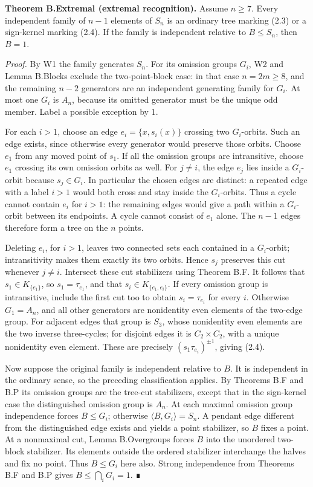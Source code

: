 \documentclass[
  11pt,
  a4paper,
]{article}
\begin{document}
\textbf{Theorem B.Extremal (extremal recognition).} Assume \(n\geq7\).
Every independent family of \(n-1\) elements of \(S_n\) is an ordinary
tree marking (2.3) or a sign-kernel marking (2.4). If the family is
independent relative to \(B\leq S_n\), then \(B=1\).

\emph{Proof.} By W1 the family generates \(S_n\). For its omission
groups \(G_i\), W2 and Lemma B.Blocks exclude the two-point-block case:
in that case \(n=2m\geq8\), and the remaining \(n-2\) generators are an
independent generating family for \(G_i\). At most one \(G_i\) is
\(A_n\), because its omitted generator must be the unique odd member.
Label a possible exception by \(1\).

For each \(i>1\), choose an edge \(e_i=\{x,s_i(x)\}\) crossing two
\(G_i\)-orbits. Such an edge exists, since otherwise every generator
would preserve those orbits. Choose \(e_1\) from any moved point of
\(s_1\). If all the omission groups are intransitive, choose \(e_1\)
crossing its own omission orbits as well. For \(j\ne i\), the edge
\(e_j\) lies inside a \(G_i\)-orbit because \(s_j\in G_i\). In
particular the chosen edges are distinct: a repeated edge with a label
\(i>1\) would both cross and stay inside the \(G_i\)-orbits. Thus a
cycle cannot contain \(e_i\) for \(i>1\): the remaining edges would give
a path within a \(G_i\)-orbit between its endpoints. A cycle cannot
consist of \(e_1\) alone. The \(n-1\) edges therefore form a tree on the
\(n\) points.

Deleting \(e_i\), for \(i>1\), leaves two connected sets each contained
in a \(G_i\)-orbit; intransitivity makes them exactly its two orbits.
Hence \(s_j\) preserves this cut whenever \(j\ne i\). Intersect these
cut stabilizers using Theorem B.F. It follows that
\(s_1\in K_{\{e_1\}}\), so \(s_1=\tau_{e_1}\), and that
\(s_i\in K_{\{e_1,e_i\}}\). If every omission group is intransitive,
include the first cut too to obtain \(s_i=\tau_{e_i}\) for every \(i\).
Otherwise \(G_1=A_n\), and all other generators are nonidentity even
elements of the two-edge group. For adjacent edges that group is
\(S_3\), whose nonidentity even elements are the two inverse
three-cycles; for disjoint edges it is \(C_2\times C_2\), with a unique
nonidentity even element. These are precisely
\((s_1\tau_{e_i})^{\pm1}\), giving (2.4).

Now suppose the original family is independent relative to \(B\). It is
independent in the ordinary sense, so the preceding classification
applies. By Theorems B.F and B.P its omission groups are the tree-cut
stabilizers, except that in the sign-kernel case the distinguished
omission group is \(A_n\). At each maximal omission group independence
forces \(B\leq G_i\); otherwise \(\langle B,G_i\rangle=S_n\). A pendant
edge different from the distinguished edge exists and yields a point
stabilizer, so \(B\) fixes a point. At a nonmaximal cut, Lemma
B.Overgroups forces \(B\) into the unordered two-block stabilizer. Its
elements outside the ordered stabilizer interchange the halves and fix
no point. Thus \(B\leq G_i\) here also. Strong independence from
Theorems B.F and B.P gives \(B\leq\bigcap_iG_i=1\). ∎
\end{document}
